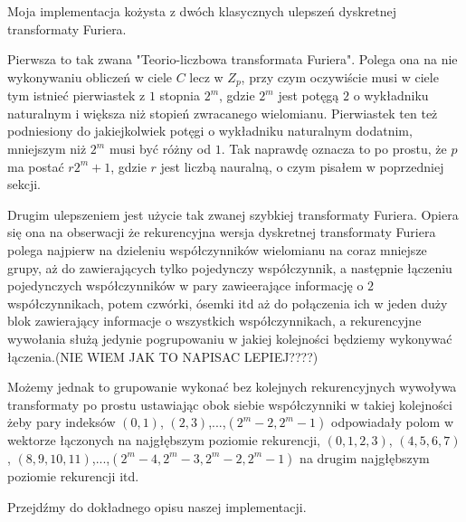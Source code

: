 \documentclass{article}
\begin{document}
Moja implementacja kożysta z dwóch klasycznych ulepszeń dyskretnej transformaty Furiera. 

Pierwsza to tak zwana "Teorio-liczbowa transformata Furiera". Polega ona na nie wykonywaniu obliczeń w ciele $C$ lecz
w $Z_p$, przy czym oczywiście musi w ciele tym istnieć pierwiastek z $1$ stopnia $2^m$, gdzie $2^m$ jest potęgą $2$ o wykładniku
naturalnym i większa niż stopień zwracanego wielomianu. Pierwiastek ten też podniesiony do jakiejkolwiek potęgi 
o wykładniku naturalnym dodatnim, mniejszym niż $2^m$ musi być różny od $1$. 
Tak naprawdę oznacza to po prostu, że $p$ ma postać $r2^m+1$, gdzie $r$ jest liczbą nauralną, o czym pisałem w poprzedniej 
sekcji.

Drugim ulepszeniem jest użycie tak zwanej szybkiej transformaty Furiera. Opiera się ona na obserwacji że rekurencyjna wersja dyskretnej transformaty Furiera 
polega najpierw na dzieleniu współczynników wielomianu na coraz mniejsze grupy, aż do zawierających tylko pojedynczy współczynnik, a następnie łączeniu pojedynczych współczynników
w pary zawieerające informację o $2$ współczynnikach, potem czwórki, ósemki itd aż do połączenia ich w jeden duży blok zawierający informacje o wszystkich współczynnikach, a rekurencyjne wywołania służą jedynie 
pogrupowaniu w jakiej kolejności będziemy wykonywać łączenia.(NIE WIEM JAK TO NAPISAC LEPIEJ????)
 
Możemy jednak to grupowanie wykonać bez kolejnych rekurencyjnych wywoływa transformaty po prostu ustawiając obok siebie współczynniki w takiej kolejności 
żeby pary indeksów $(0,1)$, $(2,3)$,...,$(2^m-2,2^m-1)$ odpowiadały polom w wektorze łączonych na najgłębszym poziomie rekurencji, $(0,1,2,3)$,
$(4,5,6,7)$, $(8,9,10,11)$,...,$(2^m-4,2^m-3,2^m-2,2^m-1)$ na drugim najgłębszym poziomie rekurencji itd. 

Przejdźmy do dokładnego opisu naszej implementacji. 
\end{document}
